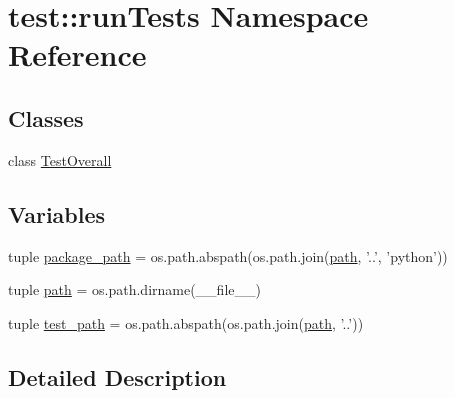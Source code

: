\hypertarget{namespacetest_1_1runTests}{\section{test\-:\-:run\-Tests \-Namespace \-Reference}
\label{d1/d2b/namespacetest_1_1runTests}
}
\subsection*{\-Classes}
\begin{DoxyCompactItemize}
\item 
class \hyperlink{classtest_1_1runTests_1_1TestOverall}{\-Test\-Overall}
\end{DoxyCompactItemize}
\subsection*{\-Variables}
\begin{DoxyCompactItemize}
\item 
tuple \hyperlink{namespacetest_1_1runTests_a2af511a0550427b87fbe51628ba30779}{package\-\_\-path} = os.\-path.\-abspath(os.\-path.\-join(\hyperlink{namespacetest_1_1runTests_afa3e11c0c61a27c8c663d851f380d8c5}{path}, '..', 'python'))
\item 
tuple \hyperlink{namespacetest_1_1runTests_afa3e11c0c61a27c8c663d851f380d8c5}{path} = os.\-path.\-dirname(\-\_\-\-\_\-file\-\_\-\-\_\-)
\item 
tuple \hyperlink{namespacetest_1_1runTests_a1e0d9e48d59a05e7ff157f932bcf0112}{test\-\_\-path} = os.\-path.\-abspath(os.\-path.\-join(\hyperlink{namespacetest_1_1runTests_afa3e11c0c61a27c8c663d851f380d8c5}{path}, '..'))
\end{DoxyCompactItemize}


\subsection{\-Detailed \-Description}
 

